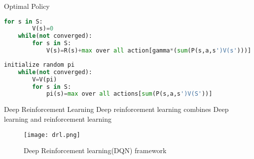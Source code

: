 \begin{frame}[fragile]{Optimal Policy}
    \begin{lstlisting}[language=python, caption=value iteration algorithm]
    for s in S:
        V(s)=0
    while(not converged):
        for s in S:
            V(s)=R(s)+max over all action[gamma*(sum(P(s,a,s')V(s')))]
    \end{lstlisting}
    
    \begin{lstlisting}[language=python, caption=Policy iteration algorithm]
    initialize random pi
    while(not converged):
        V=V(pi)
        for s in S:
            pi(s)=max over all actions[sum(P(s,a,s')V(S'))]
    \end{lstlisting}
\end{frame}

\begin{frame}{Deep Reinforcement Learning}
    Deep reinforcement learning combines Deep learning and reinforcement learning
    \begin{figure}
        \centering
        \texttt{[image: drl.png]}\\
        \caption{Deep Reinforcement learning(DQN) framework}
        \label{fig:drl}
    \end{figure}
\end{frame}

